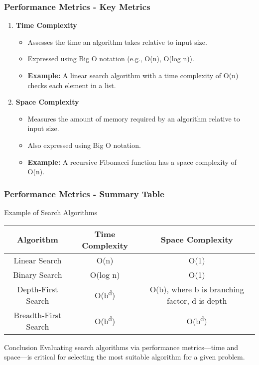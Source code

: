 \documentclass[aspectratio=169]{beamer}
\begin{document}
\begin{frame}[fragile]
    \frametitle{Performance Metrics - Key Metrics}
    \begin{enumerate}
        \item \textbf{Time Complexity}
            \begin{itemize}
                \item Assesses the time an algorithm takes relative to input size.
                \item Expressed using Big O notation (e.g., O(n), O(log n)).
                \item \textbf{Example:} A linear search algorithm with a time complexity of O(n) checks each element in a list.
            \end{itemize}
        \item \textbf{Space Complexity}
            \begin{itemize}
                \item Measures the amount of memory required by an algorithm relative to input size.
                \item Also expressed using Big O notation.
                \item \textbf{Example:} A recursive Fibonacci function has a space complexity of O(n).
            \end{itemize}
    \end{enumerate}
\end{frame}

\begin{frame}[fragile]
    \frametitle{Performance Metrics - Summary Table}
    \begin{block}{Example of Search Algorithms}
    \begin{tabular}{|c|c|c|}
        \hline
        \textbf{Algorithm} & \textbf{Time Complexity} & \textbf{Space Complexity} \\
        \hline
        Linear Search & O(n) & O(1) \\
        Binary Search & O(log n) & O(1) \\
        Depth-First Search & O(b\textsuperscript{d}) & O(b), where b is branching factor, d is depth \\
        Breadth-First Search & O(b\textsuperscript{d}) & O(b\textsuperscript{d}) \\
        \hline
    \end{tabular}
    \end{block}
    
    \begin{block}{Conclusion}
        Evaluating search algorithms via performance metrics—time and space—is critical for selecting the most suitable algorithm for a given problem.
    \end{block}
\end{frame}
\end{document}
